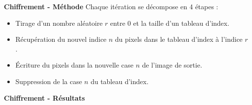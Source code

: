 \documentclass{beamer}
\begin{document}
\begin{frame}[t]
\begin{columns}[t]
\begin{column}{.49\linewidth}
\begin{block}{\centering \textbf{Chiffrement - Méthode}}
                    Chaque itération se décompose en 4 étapes :
                    \begin{itemize}[label=-]
                        \item Tirage d'un nombre aléatoire $r$ entre 0 et la taille d'un tableau d'index.
                        \item Récupération du nouvel indice $n$ du pixels dans le tableau d'index à l'indice $r$.
                        \item Écriture du pixels dans la nouvelle case $n$ de l'image de sortie.
                        \item Suppression de la case $n$ du tableau d'index.
                    \end{itemize}

                    \vspace{0.5cm}
                \end{block}




                \begin{block}{\centering \textbf{Chiffrement - Résultats}}
                    \vspace{0.5cm}


\end{block}
\end{column}
\end{columns}
\end{frame}
\end{document}
